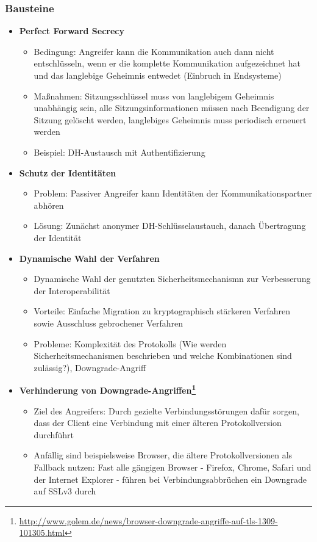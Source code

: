 \subsubsection{Bausteine}
\begin{itemize}
	\item \textbf{Perfect Forward Secrecy}
	\begin{itemize}
		\item Bedingung: Angreifer kann die Kommunikation auch dann nicht entschlüsseln, wenn er die komplette Kommunikation aufgezeichnet hat und das langlebige Geheimnis entwedet (Einbruch in Endsysteme)
		\item Maßnahmen: Sitzungsschlüssel muss von langlebigem Geheimnis unabhängig sein, alle Sitzungsinformationen müssen nach Beendigung der Sitzung gelöscht werden, langlebiges Geheimnis muss periodisch erneuert werden
		\item Beispiel: DH-Austausch mit Authentifizierung
	\end{itemize}
	\item \textbf{Schutz der Identitäten}
	\begin{itemize}
		\item Problem: Passiver Angreifer kann Identitäten der Kommunikationspartner abhören
		\item Lösung: Zunächst anonymer DH-Schlüsselaustauch, danach Übertragung der Identität
	\end{itemize}
	\item \textbf{Dynamische Wahl der Verfahren}
	\begin{itemize}
		\item Dynamische Wahl der genutzten Sicherheitsmechanismn zur Verbesserung der Interoperabilität
		\item Vorteile: Einfache Migration zu kryptographisch stärkeren Verfahren sowie Ausschluss gebrochener Verfahren
		\item Probleme: Komplexität des Protokolls (Wie werden Sicherheitsmechanismen beschrieben und welche Kombinationen sind zulässig?), Downgrade-Angriff
	\end{itemize}
	\item \textbf{Verhinderung von Downgrade-Angriffen\footnote{\url{http://www.golem.de/news/browser-downgrade-angriffe-auf-tls-1309-101305.html}}}
	\begin{itemize}
		\item Ziel des Angreifers: Durch gezielte Verbindungsstörungen dafür sorgen, dass der Client eine Verbindung mit einer älteren Protokollversion durchführt
		\item Anfällig sind beispielsweise Browser, die ältere Protokollversionen als Fallback nutzen: Fast alle gängigen Browser - Firefox, Chrome, Safari und der Internet Explorer - führen bei Verbindungsabbrüchen ein Downgrade auf SSLv3 durch

\end{itemize}
\end{itemize}
